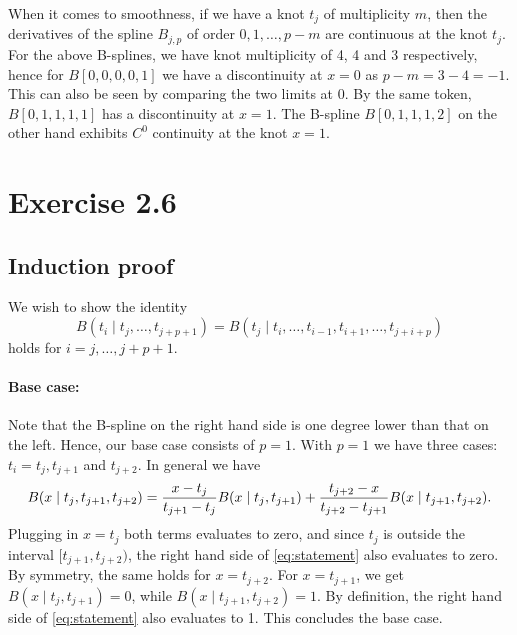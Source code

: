 \documentclass[a4paper]{article}
\begin{document}
    When it comes to smoothness, if we have a knot $t_j$ of multiplicity $m$,
    then the derivatives of the spline $B_{j, p}$ of order $0, 1, \ldots, p -
    m$ are continuous at the knot $t_j$. For the above B-splines, we have knot
    multiplicity of 4, 4 and 3 respectively, hence for $B[0, 0, 0, 0, 1]$ we
    have a discontinuity at $x = 0$ as $p - m = 3 - 4 = -1$. This can also be
    seen by comparing the two limits at 0. By the same token, $B[0, 1, 1, 1,
    1]$ has a discontinuity at $x = 1$. The B-spline $B[0, 1, 1, 1, 2]$ on the
    other hand exhibits $C^0$ continuity at the knot $x = 1$.
    

    \section*{Exercise 2.6}
    
    \subsection*{Induction proof}
    We wish to show the identity
    \begin{equation}
        \label{eq:statement}
        B(t_i \mid t_j, \ldots, t_{j+p+1}) = B(t_j \mid t_i, \ldots, t_{i-1}, t_{i+1}, \ldots, t_{j + i + p})
    \end{equation}
    holds for $i = j, \ldots, j+p+1$. 
    
    \paragraph{Base case:} Note that the B-spline on the right hand
    side is one degree lower than that on the left. Hence, our base case
    consists of $p = 1$. With $p = 1$ we have three cases: $t_i = t_j, t_{j+1}$
    and $t_{j+2}$. In general we have
    \begin{equation}
        \notag
        B(x \mid t_j, t_{j+1}, t_{j+2}) = \frac{x - t_j}{t_{j+1} - t_j} B(x \mid t_j, t_{j+1}) 
                                        + \frac{t_{j+2} - x}{t_{j+2} - t_{j+1}} B(x \mid t_{j+1}, t_{j+2}).
    \end{equation}
    Plugging in $x = t_j$ both terms evaluates to zero, and since $t_j$ is
    outside the interval $[t_{j+1}, t_{j+2})$, the right hand side of
    \ref{eq:statement} also evaluates to zero. By symmetry, the same holds for
    $x = t_{j+2}$. For $x = t_{j+1}$, we get $B(x \mid t_j, t_{j+1}) = 0$,
    while $B(x \mid t_{j+1}, t_{j+2}) = 1$. By definition, the right hand side
    of \cref{eq:statement} also evaluates to 1. This concludes the base case.
\end{document}
